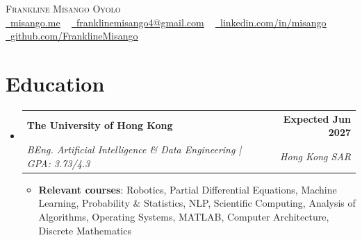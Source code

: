 \documentclass[letterpaper,11pt]{article}
\makeatletter
\newcommand{\resumeItem}[1]{
  \item\small{
    {#1 \vspace{-2pt}}
  }
}
\newcommand{\resumeSubheading}[4]{
  \vspace{-2pt}\item
    \begin{tabular*}{1.0\textwidth}[t]{l@{\extracolsep{\fill}}r}
      \textbf{#1} & \textbf{\small #2} \\
      \textit{\small#3} & \textit{\small #4} \\
    \end{tabular*}\vspace{-7pt}
}
\newcommand{\resumeSubHeadingListStart}{\begin{itemize}[leftmargin=0.0in, label={}]}
\newcommand{\resumeSubHeadingListEnd}{\end{itemize}}
\newcommand{\resumeItemListStart}{\begin{itemize}}
\newcommand{\resumeItemListEnd}{\end{itemize}\vspace{-5pt}}
\makeatother
\begin{document}
\begin{center}
    {\Huge \scshape Frankline Misango Oyolo} \\ \vspace{1pt}
    \small \href{https://misango.me}{\raisebox{-0.2\height}\faGlobe\ \underline{misango.me}} ~
    \href{mailto:franklinemisango4@gmail.com}{\raisebox{-0.2\height}\faEnvelope\ \underline{franklinemisango4@gmail.com}} ~ 
    \href{https://linkedin.com/in/misango}{\raisebox{-0.2\height}\faLinkedin\ \underline{linkedin.com/in/misango}} ~
    \href{https://github.com/FranklineMisango}{\raisebox{-0.2\height}\faGithub\ \underline{github.com/FranklineMisango}}
    \vspace{-8pt}
\end{center}

\section{Education}
  \resumeSubHeadingListStart
    \resumeSubheading
      {The University of Hong Kong}{Expected Jun 2027}
      {BEng. Artificial Intelligence \& Data Engineering | GPA: 3.73/4.3}{Hong Kong SAR}
      \resumeItemListStart
        \resumeItem{\textbf{Relevant courses}: Robotics, Partial Differential Equations, Machine Learning, Probability \& Statistics, NLP, Scientific Computing, Analysis of Algorithms, Operating Systems, MATLAB, Computer Architecture, Discrete Mathematics}
      \resumeItemListEnd
  \resumeSubHeadingListEnd
\vspace{-18pt}

\end{document}
